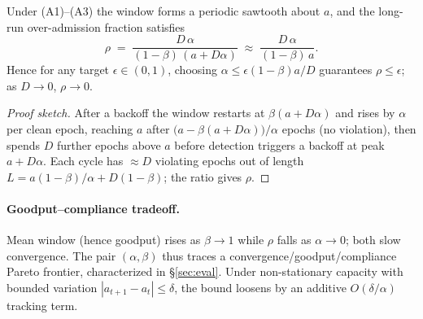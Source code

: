 \begin{proposition}\label{prop:bound}
Under \textnormal{(A1)--(A3)} the window forms a periodic sawtooth about $a$, and
the long-run over-admission fraction satisfies
\begin{equation}
\rho \;=\; \frac{D\,\alpha}{(1-\beta)\,(a+D\alpha)}
\;\approx\; \frac{D\,\alpha}{(1-\beta)\,a}.
\end{equation}
Hence for any target $\epsilon\in(0,1)$, choosing $\alpha\le \epsilon(1-\beta)a/D$
guarantees $\rho\le\epsilon$; as $D\to0$, $\rho\to0$.
\end{proposition}
\begin{proof}[Proof sketch]
After a backoff the window restarts at $\beta(a+D\alpha)$ and rises by $\alpha$
per clean epoch, reaching $a$ after $\big(a-\beta(a+D\alpha)\big)/\alpha$ epochs
(no violation), then spends $D$ further epochs above $a$ before detection triggers
a backoff at peak $a+D\alpha$. Each cycle has $\approx D$ violating epochs out of
length $L=a(1-\beta)/\alpha + D(1-\beta)$; the ratio gives $\rho$.
\end{proof}

\paragraph{Goodput--compliance tradeoff.}
Mean window (hence goodput) rises as $\beta\to1$ while $\rho$ falls as
$\alpha\to0$; both slow convergence. The pair $(\alpha,\beta)$ thus traces a
convergence/goodput/compliance Pareto frontier, characterized in
\S\ref{sec:eval}. Under non-stationary capacity with bounded variation
$|a_{t+1}-a_t|\le\delta$, the bound loosens by an additive $O(\delta/\alpha)$
tracking term.

